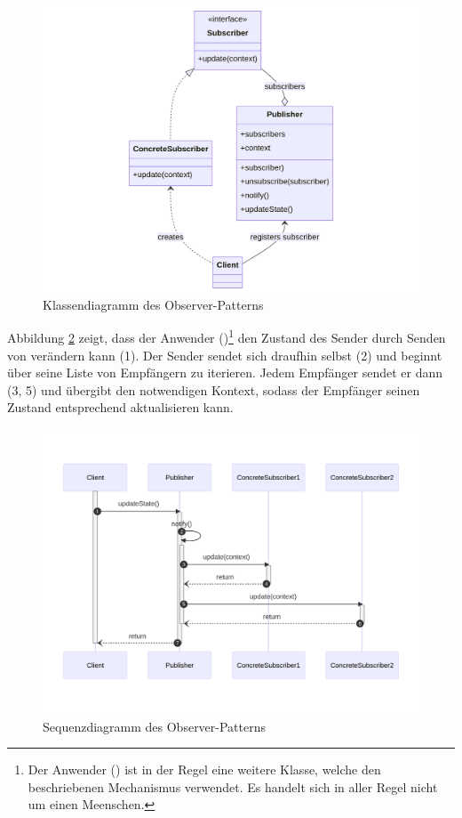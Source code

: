 \begin{figure}[htbp]
	\centering
	\includegraphics[width=0.95\linewidth]{images/patterns/observer-class.png}
	\caption{Klassendiagramm des Observer-Patterns \cite{skobeleva_observer_2023}}
	\label{fig:observer-class}
\end{figure}

Abbildung \ref{fig:observer-seq} zeigt, dass der Anwender ()\footnote{Der Anwender () ist in der Regel eine weitere Klasse, welche den beschriebenen Mechanismus verwendet. Es handelt sich in aller Regel nicht um einen Meenschen.} den Zustand des Sender durch Senden von  verändern kann (1). Der Sender sendet sich draufhin selbst  (2) und beginnt über seine Liste von Empfängern zu iterieren. Jedem Empfänger sendet er dann  (3, 5) und übergibt den notwendigen Kontext, sodass der Empfänger seinen Zustand entsprechend aktualisieren kann.

\begin{figure}[htbp]
	\centering
	\includegraphics[width=0.95\linewidth]{images/patterns/observer-seq.png}
	\caption{Sequenzdiagramm des Observer-Patterns \cite{skobeleva_observer_2023}}
	\label{fig:observer-seq}
\end{figure}

